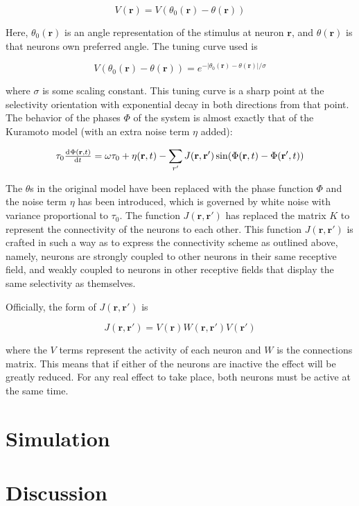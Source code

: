 \documentclass[12pt]{article}
\begin{document}
$$ V(\mathbf{r})=V(\theta_0(\mathbf{r})-\theta(\mathbf{r})) $$

Here, $\theta_0(\mathbf{r})$ is an angle representation of the stimulus at neuron $\mathbf{r}$, and $\theta(\mathbf{r})$ is that neurons own preferred angle.  The tuning curve used is 

$$ V(\theta_0(\mathbf{r})-\theta(\mathbf{r}))=e^{-|\theta_0(\mathbf{r})-\theta(\mathbf{r})|/\sigma} $$

where $\sigma$ is some scaling constant.  This tuning curve is a sharp point at the selectivity orientation with exponential decay in both directions from that point.  The behavior of the phases $\Phi$ of the system is almost exactly that of the Kuramoto model (with an extra noise term $\eta$ added):

$$ \tau_0\od{\Phi(\mathbf{r},t)}{t}=\omega\tau_0+\eta(\mathbf{r},t)-\sum\limits_{r'}J(\mathbf{r},\mathbf{r}')\sin(\Phi(\mathbf{r},t)-\Phi(\mathbf{r'},t)) $$

The $\theta$s in the original model have been replaced with the phase function $\Phi$ and the noise term $\eta$ has been introduced, which is governed by white noise with variance proportional to $\tau_0$.  The function $J(\mathbf{r},\mathbf{r'})$ has replaced the matrix $K$ to represent the connectivity of the neurons to each other.  This function $J(\mathbf{r},\mathbf{r'})$ is crafted in such a way as to express the connectivity scheme as outlined above, namely, neurons are strongly coupled to other neurons in their same receptive field, and weakly coupled to neurons in other receptive fields that display the same selectivity as themselves.  

Officially, the form of $J(\mathbf{r},\mathbf{r'})$ is

$$ J(\mathbf{r},\mathbf{r'})=V(\mathbf{r})W(\mathbf{r},\mathbf{r'})V(\mathbf{r'}) $$

where the $V$ terms represent the activity of each neuron and $W$ is the connections matrix.  This means that if either of the neurons are inactive the effect will be greatly reduced.  For any real effect to take place, both neurons must be active at the same time.  

\section{Simulation}



\section{Discussion}





\end{document}
